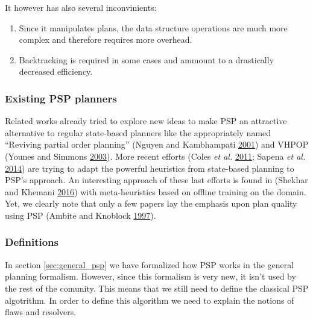\documentclass[11pt,a4paper,twoside,openright,titlepage,numbers=noenddot,headinclude,cleardoublepage=empty,openany]{scrreprt}
\theoremstyle{plain}
\theoremstyle{definition}
\theoremstyle{remark}
\providecommand{\tightlist}{%
  \setlength{\itemsep}{0pt}\setlength{\parskip}{0pt}}
\begin{document}
It however has also several inconvinients:

\begin{enumerate}
\def\labelenumi{\arabic{enumi}.}
\tightlist
\item
  Since it manipulates plans, the data structure operations are much
  more complex and therefore requires more overhead.
\item
  Backtracking is required in some cases and ammount to a drastically
  decreased efficiency.
\end{enumerate}

\hypertarget{existing-psp-planners}{%
\subsubsection{Existing PSP planners}\label{existing-psp-planners}}

Related works already tried to explore new ideas to make PSP an
attractive alternative to regular state-based planners like the
appropriately named ``Reviving partial order planning'' (Nguyen and
Kambhampati \protect\hyperlink{ref-nguyen_reviving_2001}{2001}) and
VHPOP (Younes and Simmons
\protect\hyperlink{ref-younes_vhpop_2003}{2003}). More recent efforts
(Coles \emph{et al.} \protect\hyperlink{ref-coles_popf2_2011}{2011};
Sapena \emph{et al.}
\protect\hyperlink{ref-sapena_combining_2014}{2014}) are trying to adapt
the powerful heuristics from state-based planning to PSP's approach. An
interesting approach of these last efforts is found in (Shekhar and
Khemani \protect\hyperlink{ref-shekhar_learning_2016}{2016}) with
meta-heuristics based on offline training on the domain. Yet, we clearly
note that only a few papers lay the emphasis upon plan quality using PSP
(Ambite and Knoblock
\protect\hyperlink{ref-ambite_planning_1997}{1997}).

\hypertarget{definitions}{%
\subsubsection{Definitions}\label{definitions}}

In section \ref{sec:general_psp} we have formalized how PSP works in the
general planning formalism. However, since this formalism is very new,
it isn't used by the rest of the comunity. This means that we still need
to define the classical PSP algotrithm. In order to define this
algorithm we need to explain the notions of flaws and resolvers.
\end{document}
